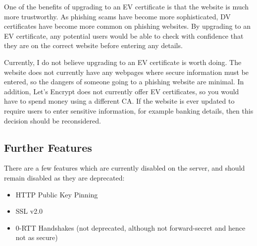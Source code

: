 \documentclass[12pt]{article}
\begin{document}
  One of the benefits of upgrading to an EV certificate is that the website is much more trustworthy.
  As phishing scams have become more sophisticated, DV certificates have become more common on phishing websites.
  By upgrading to an EV certificate, any potential users would be able to check with confidence that they are on the correct website before entering any details.

  Currently, I do not believe upgrading to an EV certificate is worth doing.
  The website does not currently have any webpages where secure information must be entered, so the dangers of someone going to a phishing website are minimal.
  In addition, Let's Encrypt does not currently offer EV certificates, so you would have to spend money using a different CA.
  If the website is ever updated to require users to enter sensitive information, for example banking details, then this decision should be reconsidered.


  \subsection{Further Features}
  There are a few features which are currently disabled on the server, and should remain disabled as they are deprecated:
  \begin{itemize}
    \item HTTP Public Key Pinning
    \item SSL v2.0
    \item 0-RTT Handshakes (not deprecated, although not forward-secret and hence not as secure)
  \end{itemize}
\end{document}

